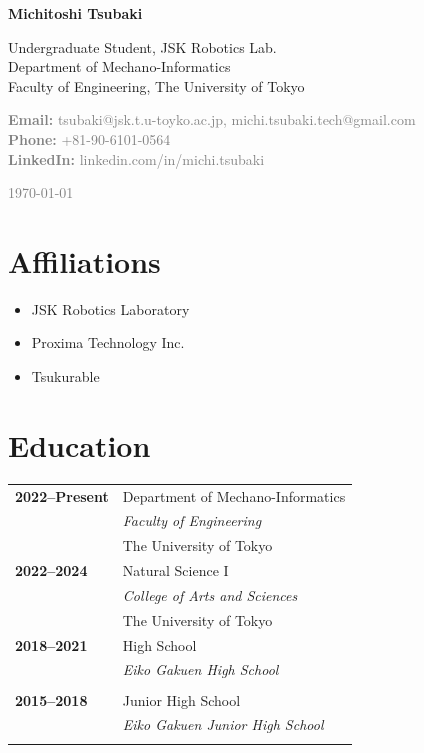 \documentclass[11pt,a4paper]{article}
\newcommand{\cventry}[4]{\textbf{#1} & #2 \\ & \textit{#3} \\ & #4 \\[0.5em]}
\begin{document}
\begin{minipage}[t]{0.7\textwidth}
    \vspace{0pt}
    {\Huge\bfseries\color{darkblue} Michitoshi Tsubaki}
    \vspace{0.3cm}
    
    {\Large Undergraduate Student, JSK Robotics Lab.}\\
    Department of Mechano-Informatics\\
    Faculty of Engineering, The University of Tokyo
    \vspace{0.5cm}
    
    \textcolor{gray}{
    \textbf{Email:} tsubaki@jsk.t.u-toyko.ac.jp, michi.tsubaki.tech@gmail.com\\
    \textbf{Phone:} +81-90-6101-0564\\
    \textbf{LinkedIn:} linkedin.com/in/michi.tsubaki
    }
\end{minipage}
\hfill
\begin{minipage}[t]{0.25\textwidth}
    \vspace{0pt}
    \raggedleft
    \textcolor{gray}{\small \today}\\[0.3cm]
\end{minipage}

\vspace{1cm}

\section{Affiliations}
\begin{itemize}[leftmargin=1cm,itemsep=0.2em]
    \item JSK Robotics Laboratory
    \item Proxima Technology Inc.
    \item Tsukurable
\end{itemize}

\section{Education}
\begin{tabularx}{\textwidth}{@{}p{2.5cm}X@{}}
\cventry{2022--Present}{Department of Mechano-Informatics}{Faculty of Engineering}{The University of Tokyo}
\cventry{2022--2024}{Natural Science I}{College of Arts and Sciences}{The University of Tokyo}
\cventry{2018--2021}{High School}{Eiko Gakuen High School}{}
\cventry{2015--2018}{Junior High School}{Eiko Gakuen Junior High School}{}
\end{tabularx}
\end{document}
